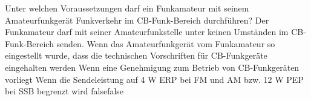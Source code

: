     {Unter welchen Voraussetzungen darf ein Funkamateur mit seinem Amateurfunkgerät Funkverkehr im CB-Funk-Bereich durchführen?}
    {Der Funkamateur darf mit seiner Amateurfunkstelle unter keinen Umständen im CB-Funk-Bereich senden.}
    {Wenn das Amateurfunkgerät vom Funkamateur so eingestellt wurde, dass die technischen Vorschriften für CB-Funkgeräte eingehalten werden}
    {Wenn eine Genehmigung zum Betrieb von CB-Funkgeräten vorliegt}
    {Wenn die Sendeleistung auf 4 W ERP bei FM und AM bzw. 12 W PEP bei SSB begrenzt wird}
    {false}{false}